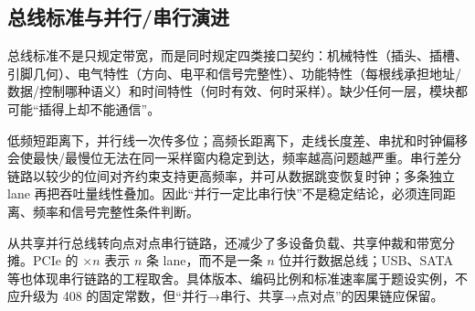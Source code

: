 \documentclass[UTF8,fontset=fandol,11pt,a4paper]{ctexart}
\begin{document}
\subsection{总线标准与并行/串行演进}
总线标准不是只规定带宽，而是同时规定四类接口契约：机械特性（插头、插槽、引脚几何）、电气特性（方向、电平和信号完整性）、功能特性（每根线承担地址/数据/控制哪种语义）和时间特性（何时有效、何时采样）。缺少任何一层，模块都可能“插得上却不能通信”。

低频短距离下，并行线一次传多位；高频长距离下，走线长度差、串扰和时钟偏移会使最快/最慢位无法在同一采样窗内稳定到达，频率越高问题越严重。串行差分链路以较少的位间对齐约束支持更高频率，并可从数据跳变恢复时钟；多条独立 lane 再把吞吐量线性叠加。因此“并行一定比串行快”不是稳定结论，必须连同距离、频率和信号完整性条件判断。

从共享并行总线转向点对点串行链路，还减少了多设备负载、共享仲裁和带宽分摊。PCIe 的 $\times n$ 表示 $n$ 条 lane，而不是一条 $n$ 位并行数据总线；USB、SATA 等也体现串行链路的工程取舍。具体版本、编码比例和标准速率属于题设实例，不应升级为 408 的固定常数，但“并行→串行、共享→点对点”的因果链应保留。
\end{document}
